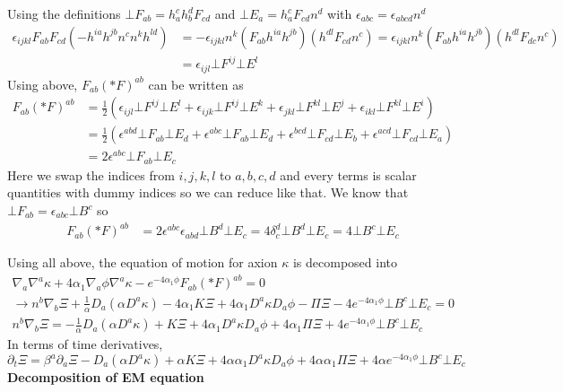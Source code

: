 \documentclass[prd]{revtex4}
\begin{document}
Using the definitions $\bot F_{ab} = h_a^c h_b^d F_{cd}$ and $\bot E_a = h_a^c F_{cd} n^d$ with $\epsilon_{abc} = \epsilon_{abcd} n^d$
\begin{align}
\epsilon_{ijkl} F_{ab} F_{cd} (- h^{ia} h^{jb} n^c n^k h^{ld} ) &= - \epsilon_{ijkl} n^k (F_{ab} h^{ia} h^{jb}) (h^{dl} F_{cd} n^c) =  \epsilon_{ijkl} n^k (F_{ab} h^{ia} h^{jb}) (h^{dl} F_{dc} n^c) \nonumber \\
											 &= \epsilon_{ijl} \bot F^{ij} \bot E^l
\end{align}
Using above, $F_{ab} (\ast F)^{ab}$ can be written as
\begin{align}
F_{ab}(\ast F)^{ab} & = \frac{1}{2} (\epsilon_{ijl} \bot F^{ij} \bot E^l + \epsilon_{ijk} \bot F^{ij} \bot E^k + \epsilon_{jkl} \bot F^{kl} \bot E^j + \epsilon_{ikl} \bot F^{kl} \bot E^i) \nonumber \\
			      & = \frac{1}{2} (\epsilon^{abd} \bot F_{ab} \bot E_d + \epsilon^{abc} \bot F_{ab} \bot E_d + \epsilon^{bcd} \bot F_{cd} \bot E_b + \epsilon^{acd} \bot F_{cd} \bot E_a) \nonumber \\
			      & = 2 \epsilon^{abc} \bot F_{ab} \bot E_c
\end{align}
Here we swap the indices from ${i,j,k,l}$ to ${a,b,c,d}$ and every terms is scalar quantities with dummy indices so we can reduce like that. We know that $\bot F_{ab} = \epsilon_{abc} \bot B^c$ so 
\begin{align}
F_{ab}(\ast F)^{ab} &= 2 \epsilon^{abc} \epsilon_{abd} \bot B^d \bot E_c = 4 \delta_c^d \bot B^d \bot E_c = 4 \bot B^c \bot E_c
\end{align}

Using all above, the equation of motion for axion $\kappa$ is decomposed into
\begin{align}
\nabla_a \nabla^a \kappa + 4 \alpha_1 \nabla_a \phi \nabla^a \kappa  - e^{-4 \alpha_1 \phi} F_{ab}(\ast F)^{ab}  = 0 \nonumber \\
\rightarrow n^b \nabla_b \Xi + \frac{1}{\alpha} D_a (\alpha D^a \kappa) - 4 \alpha_1 K \Xi +4 \alpha_1 D^a \kappa D_a \phi - \Pi \Xi - 4 e^{-4 \alpha_1 \phi} \bot B^c \bot E_c = 0 \\
n^b \nabla_b \Xi = - \frac{1}{\alpha} D_a (\alpha D^a \kappa) + K \Xi +4 \alpha_1 D^a \kappa D_a \phi + 4 \alpha_1 \Pi \Xi + 4 e^{-4 \alpha_1 \phi} \bot B^c \bot E_c
\end{align}
In terms of time derivatives, 
\begin{equation}
\partial_t \Xi = \beta^a \partial_a \Xi -  D_a (\alpha D^a \kappa) + \alpha K \Xi +4 \alpha \alpha_1 D^a \kappa D_a \phi + 4 \alpha \alpha_1 \Pi \Xi + 4 \alpha e^{-4 \alpha_1 \phi} \bot B^c \bot E_c
\end{equation}
\newline
\textbf{Decomposition of EM equation}
\end{document}
